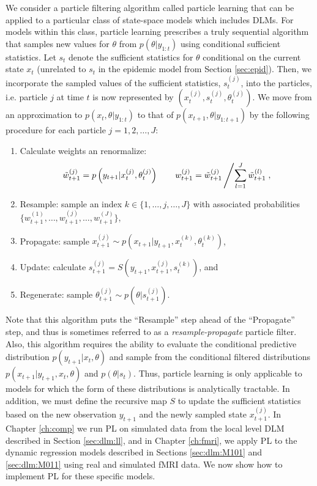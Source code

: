 We consider a particle filtering algorithm called particle learning \citep{Carv:Joha:Lope:Pols:part} that can be applied to a particular class of state-space models which includes DLMs. For models within this class, particle learning prescribes a truly sequential algorithm that samples new values for $\theta$ from $p(\theta|y_{1:t})$ using conditional sufficient statistics. Let $s_t$ denote the sufficient statistics for $\theta$ conditional on the current state $x_t$ (unrelated to $s_t$ in the epidemic model from Section \ref{sec:epid}). Then, we incorporate the sampled values of the sufficient statistics, $s_t^{(j)}$, into the particles, i.e. particle $j$ at time $t$ is now represented by $\left(x_t^{(j)},s_t^{(j)},\theta_t^{(j)}\right)$. We move from an approximation to $p(x_t,\theta|y_{1:t})$ to that of $p(x_{t+1},\theta|y_{1:t+1})$ by the following procedure for each particle $j = 1,2,\ldots,J$:
\begin{enumerate}
\item Calculate weights an renormalize:
    \[\tilde{w}_{t+1}^{(j)} = p\left(y_{t+1}|x_t^{(j)},\theta_t^{(j)}\right) \qquad w_{t+1}^{(j)} = \tilde{w}_{t+1}^{(j)} \left/ \sum_{l=1}^J \tilde{w}_{t+1}^{(l)}\right.,\]
\item Resample: sample an index $k \in \{1,\ldots,j,\ldots,J\}$ with associated probabilities $\{w_{t+1}^{(1)},\ldots,w_{t+1}^{(j)},\ldots,w_{t+1}^{(J)}\}$,
\item Propagate: sample $x_{t+1}^{(j)} \sim p\left(x_{t+1}|y_{t+1},x_t^{(k)},\theta_t^{(k)}\right)$,
\item Update: calculate $s_{t+1}^{(j)} = S\left(y_{t+1},x_{t+1}^{(j)},s_t^{(k)}\right)$, and
\item Regenerate: sample $\theta_{t+1}^{(j)} \sim p\left(\theta|s_{t+1}^{(j)}\right)$.
\end{enumerate}
Note that this algorithm puts the ``Resample'' step ahead of the ``Propagate'' step, and thus is sometimes referred to as a \emph{resample-propagate} particle filter. Also, this algorithm requires the ability to evaluate the conditional predictive distribution $p(y_{t+1}|x_t,\theta)$ and sample from the conditional filtered distributions $p(x_{t+1}|y_{t+1},x_t,\theta)$ and $p(\theta|s_t)$. Thus, particle learning is only applicable to models for which the form of these distributions is analytically tractable. In addition, we must define the recursive map $S$ to update the sufficient statistics based on the new observation $y_{t+1}$ and the newly sampled state $x_{t+1}^{(j)}$. In Chapter \ref{ch:comp} we run PL on simulated data from the local level DLM described in Section \ref{sec:dlm:ll}, and in Chapter \ref{ch:fmri}, we apply PL to the dynamic regression models described in Sections \ref{sec:dlm:M101} and \ref{sec:dlm:M011} using real and simulated fMRI data. We now show how to implement PL for these specific models.


